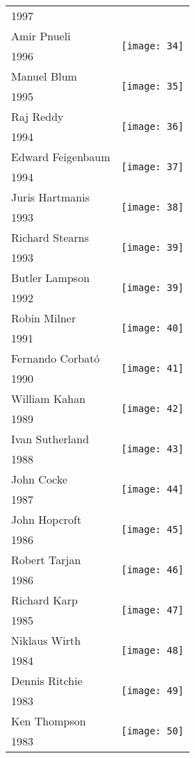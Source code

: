 \documentclass[12pt]{article}
\begin{document}
\begin{center}
\begin{longtable}{| p{} | p{} |}
1997&   \\ 
Amir Pnueli &  \multirow{2}{4em}{\texttt{[image: 34]}} \\ 
1996&   \\ 
Manuel Blum &  \multirow{2}{4em}{\texttt{[image: 35]}} \\ 
1995&   \\ 
Raj Reddy &  \multirow{2}{4em}{\texttt{[image: 36]}} \\ 
1994&   \\ 
Edward Feigenbaum &  \multirow{2}{4em}{\texttt{[image: 37]}} \\ 
1994&   \\ 
Juris Hartmanis &  \multirow{2}{4em}{\texttt{[image: 38]}} \\ 
1993&   \\ 
Richard Stearns &  \multirow{2}{4em}{\texttt{[image: 39]}} \\ 
1993&   \\ 
Butler Lampson &  \multirow{2}{4em}{\texttt{[image: 39]}} \\ 
1992&   \\ 
Robin Milner &  \multirow{2}{4em}{\texttt{[image: 40]}} \\ 
1991&   \\ 
Fernando Corbató &  \multirow{2}{4em}{\texttt{[image: 41]}} \\ 
1990&   \\ 
William Kahan &  \multirow{2}{4em}{\texttt{[image: 42]}} \\ 
1989&   \\ 
Ivan Sutherland &  \multirow{2}{4em}{\texttt{[image: 43]}} \\ 
1988&   \\ 
John Cocke &  \multirow{2}{4em}{\texttt{[image: 44]}} \\ 
1987&   \\ 
John Hopcroft &  \multirow{2}{4em}{\texttt{[image: 45]}} \\ 
1986&   \\ 
Robert Tarjan &  \multirow{2}{4em}{\texttt{[image: 46]}} \\ 
1986&   \\ 
Richard Karp &  \multirow{2}{4em}{\texttt{[image: 47]}} \\ 
1985&   \\ 
Niklaus Wirth &  \multirow{2}{4em}{\texttt{[image: 48]}} \\ 
1984&   \\ 
Dennis Ritchie &  \multirow{2}{4em}{\texttt{[image: 49]}} \\ 
1983&   \\ 
Ken Thompson &  \multirow{2}{4em}{\texttt{[image: 50]}} \\ 
1983&   \\ 


\end{longtable}
\end{center}
\end{document}
